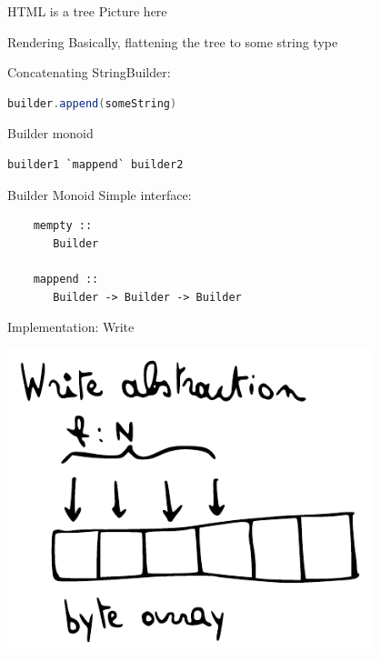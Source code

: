 \documentclass[20pt]{beamer}
\newcommand{\vspaced}{
    \vspace{5mm}
}
\begin{document}
\begin{frame}{HTML is a tree}
    Picture here
\end{frame}

\begin{frame}{Rendering}
    Basically, flattening the tree to some string type
\end{frame}

\begin{frame}[fragile]{Concatenating}
    StringBuilder:
    \begin{lstlisting}[language=Java]
    builder.append(someString)
    \end{lstlisting}
    \vspaced

    Builder monoid
    \begin{lstlisting}[language=Java]
    builder1 `mappend` builder2
    \end{lstlisting}
\end{frame}

\begin{frame}[fragile]{Builder Monoid}
    Simple interface:
    \vspaced
    \begin{lstlisting}
    mempty ::
       Builder

    mappend ::
       Builder -> Builder -> Builder
    \end{lstlisting}
\end{frame}

\begin{frame}{Implementation: Write}
    \begin{center}
    \includegraphics[width=0.8\textwidth]{images/write.pdf}
    \end{center}
\end{frame}
\end{document}
